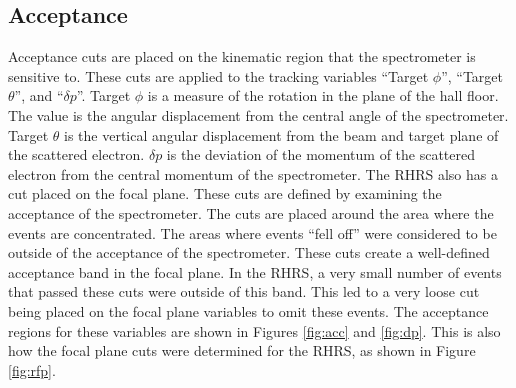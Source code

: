 \subsection{Acceptance}

Acceptance cuts are placed on the kinematic region that the spectrometer is sensitive to. These cuts are applied to the tracking variables ``Target $\phi$'', ``Target $\theta$'', and ``$\delta p$''. Target $\phi$ is a measure of the rotation in the plane of the hall floor. The value is the angular displacement from the central angle of the spectrometer. Target $\theta$ is the vertical angular displacement from the beam and target plane of the scattered electron. $\delta p$ is the deviation of the momentum of the scattered electron from the central momentum of the spectrometer. The RHRS also has a cut placed on the focal plane. These cuts are defined by examining the acceptance of the spectrometer. The cuts are placed around the area where the events are concentrated. The areas where events ``fell off'' were considered to be outside of the acceptance of the spectrometer. These cuts create a well-defined acceptance band in the focal plane. In the RHRS, a very small number of events that passed these cuts were outside of this band. This led to a very loose cut being placed on the focal plane variables to omit these events. The acceptance regions for these variables are shown in Figures \ref{fig:acc} and \ref{fig:dp}. This is also how the focal plane cuts were determined for the RHRS, as shown in Figure \ref{fig:rfp}.

